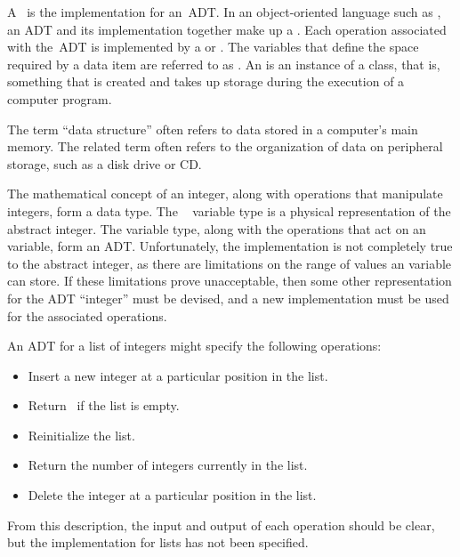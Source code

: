 A~ is the
implementation for an~ADT.
In an object-oriented language
such as \Lang, an ADT and its implementation together make up a
.
Each operation associated with the~ADT is implemented by a
or .
The variables that define the space required by a data item are
referred to as .
An  is an instance of a class, that is, something that
is created and takes up storage during the execution of a
computer program.

The term ``data structure'' often refers to data
stored in a computer's main memory.
The related term 
often refers to the organization of data on peripheral storage, such
as a disk drive or CD.


\begin{example}
The mathematical concept of an integer, along with operations
that manipulate integers, form a
data type.
The \Lang\  variable type is a physical representation of
the abstract integer.
The  variable type, along with the operations that act on an 
 variable, form an ADT.
Unfortunately, the  implementation is not
completely true to the abstract integer, as there are limitations on
the range of values an  variable can store.
If these limitations prove unacceptable, then some other
representation for the ADT ``integer'' must be devised, and a new
implementation must be used for the associated operations.
\end{example}

\begin{example}
\label{ListADTExamp}
An ADT for a list of integers might specify the following operations:

\begin{itemize}

\item
Insert a new integer at a particular position in the list.

\item
Return \TRUE\ if the list is empty.

\item
Reinitialize the list.

\item
Return the number of integers currently in the list.

\item
Delete the integer at a particular position in the list.

\end{itemize}

From this description, the input and output of each operation should
be clear, but the implementation for lists has not been
specified.
\end{example}

